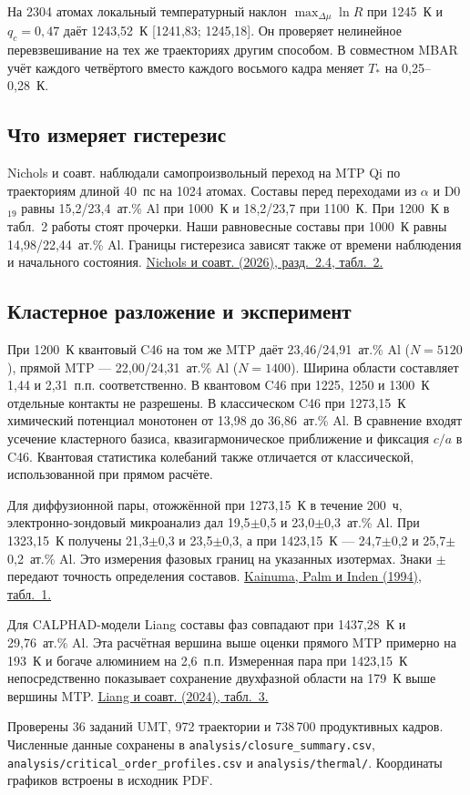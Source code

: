 \documentclass[11pt,a4paper]{article}
\begin{document}
На 2304 атомах локальный температурный наклон \(\max_{\Delta\mu}\ln R\) при 1245~К и \(q_c=0{,}47\) даёт 1243,52~К [1241,83; 1245,18]. Он проверяет нелинейное перевзвешивание на тех же траекториях другим способом. В совместном MBAR учёт каждого четвёртого вместо каждого восьмого кадра меняет \(T_*\) на 0,25--0,28~К.
\subsection*{Что измеряет гистерезис}
Nichols и соавт. наблюдали самопроизвольный переход на MTP Qi по траекториям длиной 40~пс на 1024 атомах. Составы перед переходами из \(\alpha\) и D0$_{19}$ равны 15,2/23,4~ат.\% Al при 1000~К и 18,2/23,7 при 1100~К. При 1200~К в табл.~2 работы стоят прочерки. Наши равновесные составы при 1000~К равны 14,98/22,44~ат.\% Al. Границы гистерезиса зависят также от времени наблюдения и начального состояния. \href{https://doi.org/10.3390/met16020140}{Nichols и соавт. (2026), разд.~2.4, табл.~2.}

\subsection*{Кластерное разложение и эксперимент}
При 1200~К квантовый C46 на том же MTP даёт 23,46/24,91~ат.\% Al (\(N=5120\)), прямой MTP --- 22,00/24,31~ат.\% Al (\(N=1400\)). Ширина области составляет 1,44 и 2,31~п.п. соответственно. В квантовом C46 при 1225, 1250 и 1300~К отдельные контакты не разрешены. В классическом C46 при 1273,15~К химический потенциал монотонен от 13,98 до 36,86~ат.\% Al. В сравнение входят усечение кластерного базиса, квазигармоническое приближение и фиксация \(c/a\) в C46. Квантовая статистика колебаний также отличается от классической, использованной при прямом расчёте.

Для диффузионной пары, отожжённой при 1273,15~К в течение 200~ч, электронно-зондовый микроанализ дал 19,5\(\pm\)0,5 и 23,0\(\pm\)0,3~ат.\% Al. При 1323,15~К получены 21,3\(\pm\)0,3 и 23,5\(\pm\)0,3, а при 1423,15~К --- 24,7\(\pm\)0,2 и 25,7\(\pm\)0,2~ат.\% Al. Это измерения фазовых границ на указанных изотермах. Знаки \(\pm\) передают точность определения составов. \href{https://doi.org/10.1016/0966-9795(94)90018-3}{Kainuma, Palm и Inden (1994), табл.~1.}

Для CALPHAD-модели Liang составы фаз совпадают при 1437,28~К и 29,76~ат.\% Al. Эта расчётная вершина выше оценки прямого MTP примерно на 193~К и богаче алюминием на 2,6~п.п. Измеренная пара при 1423,15~К непосредственно показывает сохранение двухфазной области на 179~К выше вершины MTP. \href{https://doi.org/10.1007/s11669-024-01124-9}{Liang и соавт. (2024), табл.~3.}

{\footnotesize\color{muted}Проверены 36 заданий UMT, 972 траектории и 738\,700 продуктивных кадров. Численные данные сохранены в \texttt{analysis/closure\_summary.csv}, \texttt{analysis/critical\_order\_profiles.csv} и \texttt{analysis/thermal/}. Координаты графиков встроены в исходник PDF.}
\end{document}
